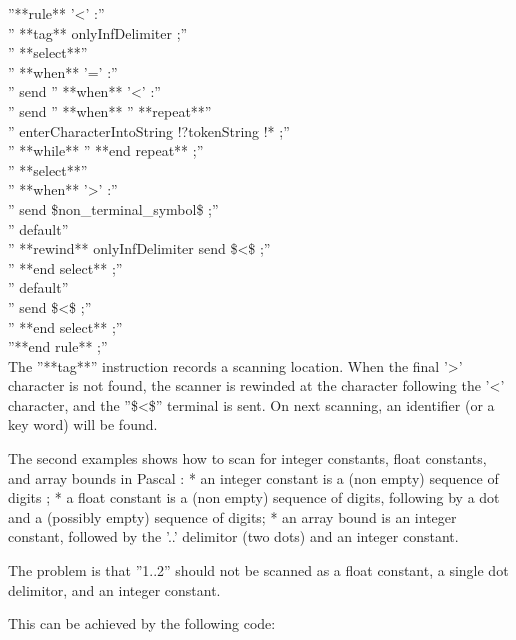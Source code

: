 {''**rule** '<' :''\\
'' **tag** onlyInfDelimiter ;''\\
'' **select**''\\
'' **when** '=' :''\\
'' send %
'' **when** '<' :''\\
''  send %
'' **when** %
''  **repeat**''\\
''   enterCharacterIntoString !?tokenString !* ;''\\
''  **while** %
''  **end repeat** ;''\\
''  **select**''\\
''  **when** '>' :''\\
''   send \$non\_terminal\_symbol\$ ;''\\
''  default''\\
''   **rewind** onlyInfDelimiter send \$<\$ ;''\\
''  **end select** ;''\\
'' default''\\
''  send \$<\$ ;''\\
'' **end select** ;''\\
''**end rule** ;''\\

The ''**tag**'' instruction records a scanning location. When the final '>' character is not found, the scanner is rewinded at the character following the '<' character, and the ''\$<\$'' terminal is sent. On next scanning, an identifier (or a key word) will be found.

The second examples shows how to scan for integer constants, float constants, and array bounds in Pascal :
  * an integer constant is a (non empty) sequence of digits ;
  * a float constant is a (non empty) sequence of digits, following by a dot and a (possibly empty) sequence of digits;
  * an array bound is an integer constant, followed by the '..' delimitor (two dots) and an integer constant.

The problem is that ''1..2'' should not be scanned as a float constant, a single dot delimitor, and an integer constant.

This can be achieved by the following code:

}
